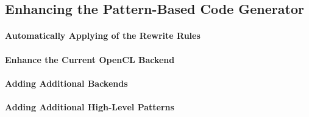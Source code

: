 \subsection{Enhancing the Pattern-Based Code Generator}
\label{section:future-work:codeGenerator}

\paragraph{Automatically Applying of the Rewrite Rules}

\paragraph{Enhance the Current OpenCL Backend}

\paragraph{Adding Additional Backends}

\paragraph{Adding Additional High-Level Patterns}

